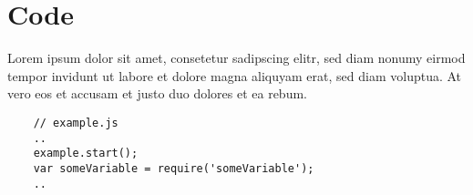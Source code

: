 \section{Code}
\label{sec:code}

	Lorem ipsum dolor sit amet, consetetur sadipscing elitr, sed diam nonumy eirmod tempor invidunt ut labore et dolore magna aliquyam erat, sed diam voluptua. At vero eos et accusam et justo duo dolores et ea rebum.
	
	\begin{lstlisting}
	// example.js
	..
	example.start();
	var someVariable = require('someVariable');
	..
	\end{lstlisting}